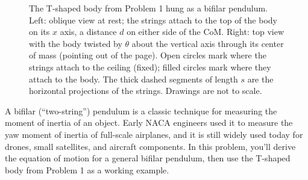 \documentclass[11pt,letterpaper]{article}
\begin{document}
\begin{figure}[h]
\caption{The T-shaped body from Problem 1 hung as a bifilar pendulum. Left: oblique view at rest; the strings attach to the top of the body on its $x$ axis, a distance $d$ on either side of the CoM. Right: top view with the body twisted by $\theta$ about the vertical axis through its center of mass (pointing out of the page). Open circles mark where the strings attach to the ceiling (fixed); filled circles mark where they attach to the body. The thick dashed segments of length $s$ are the horizontal projections of the strings. Drawings are not to scale.}
\label{fig:bifilar}
\end{figure}

\noindent A bifilar (``two-string'') pendulum is a classic technique for measuring the moment of inertia of an object. Early NACA engineers used it to measure the yaw moment of inertia of full-scale airplanes, and it is still widely used today for drones, small satellites, and aircraft components. In this problem, you'll derive the equation of motion for a general bifilar pendulum, then use the T-shaped body from Problem 1 as a working example.
\end{document}
